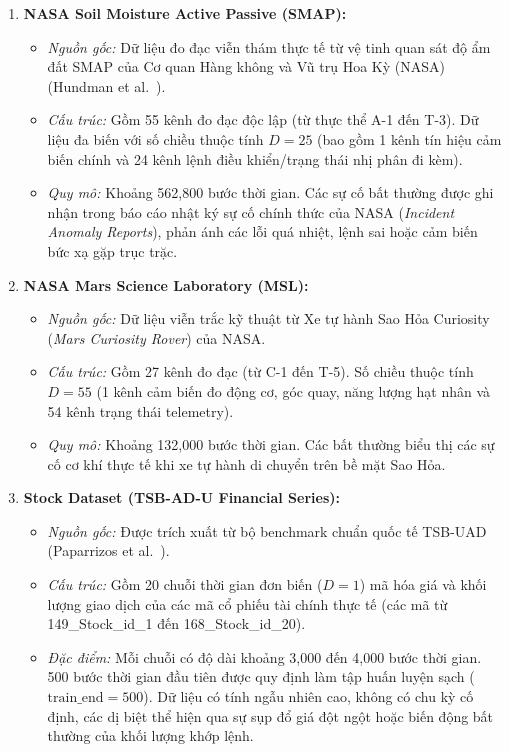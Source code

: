 \documentclass[11pt,journal,onecolumn]{IEEEtran}
\begin{document}
\begin{enumerate}
    \item \textbf{NASA Soil Moisture Active Passive (SMAP):}
    \begin{itemize}
        \item \textit{Nguồn gốc:} Dữ liệu đo đạc viễn thám thực tế từ vệ tinh quan sát độ ẩm đất SMAP của Cơ quan Hàng không và Vũ trụ Hoa Kỳ (NASA) (Hundman et al.~\cite{hundman2018detecting}).
        \item \textit{Cấu trúc:} Gồm 55 kênh đo đạc độc lập (từ thực thể A-1 đến T-3). Dữ liệu đa biến với số chiều thuộc tính $D = 25$ (bao gồm 1 kênh tín hiệu cảm biến chính và 24 kênh lệnh điều khiển/trạng thái nhị phân đi kèm).
        \item \textit{Quy mô:} Khoảng 562,800 bước thời gian. Các sự cố bất thường được ghi nhận trong báo cáo nhật ký sự cố chính thức của NASA (\textit{Incident Anomaly Reports}), phản ánh các lỗi quá nhiệt, lệnh sai hoặc cảm biến bức xạ gặp trục trặc.
    \end{itemize}
    
    \item \textbf{NASA Mars Science Laboratory (MSL):}
    \begin{itemize}
        \item \textit{Nguồn gốc:} Dữ liệu viễn trắc kỹ thuật từ Xe tự hành Sao Hỏa Curiosity (\textit{Mars Curiosity Rover}) của NASA.
        \item \textit{Cấu trúc:} Gồm 27 kênh đo đạc (từ C-1 đến T-5). Số chiều thuộc tính $D = 55$ (1 kênh cảm biến đo động cơ, góc quay, năng lượng hạt nhân và 54 kênh trạng thái telemetry).
        \item \textit{Quy mô:} Khoảng 132,000 bước thời gian. Các bất thường biểu thị các sự cố cơ khí thực tế khi xe tự hành di chuyển trên bề mặt Sao Hỏa.
    \end{itemize}
    
    \item \textbf{Stock Dataset (TSB-AD-U Financial Series):}
    \begin{itemize}
        \item \textit{Nguồn gốc:} Được trích xuất từ bộ benchmark chuẩn quốc tế TSB-UAD (Paparrizos et al.~\cite{paparrizos2022tsb}).
        \item \textit{Cấu trúc:} Gồm 20 chuỗi thời gian đơn biến ($D = 1$) mã hóa giá và khối lượng giao dịch của các mã cổ phiếu tài chính thực tế (các mã từ 149\_Stock\_id\_1 đến 168\_Stock\_id\_20).
        \item \textit{Đặc điểm:} Mỗi chuỗi có độ dài khoảng 3,000 đến 4,000 bước thời gian. 500 bước thời gian đầu tiên được quy định làm tập huấn luyện sạch ($\text{train\_end} = 500$). Dữ liệu có tính ngẫu nhiên cao, không có chu kỳ cố định, các dị biệt thể hiện qua sự sụp đổ giá đột ngột hoặc biến động bất thường của khối lượng khớp lệnh.
    \end{itemize}
    

\end{enumerate}
\end{document}
